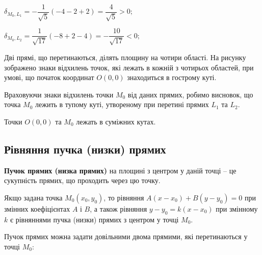 \begin{solution}
{}
	\parbox{\textwidth - 2.5cm}{
		$\delta_{M_0,L_1} = -\dfrac{1}{\sqrt{5}}(-4 -2 +2) = \dfrac{4}{\sqrt{5}} > 0;$
	
		$\delta_{M_0,L_2} = \dfrac{1}{\sqrt{17}}(-8 +2 -4) = -\dfrac{10}{\sqrt{17}} < 0;$
	
		Дві прямі, що перетинаються, ділять площину на
		чотири області. На рисунку зображено знаки відхилень
		точок, які лежать в кожній з чотирьох областей, при умові, що початок координат
		$O(0,0)$ знаходиться в гострому куті.
	}
	
	Враховуючи знаки відхилень точки $M_0$ від даних прямих, робимо висновок,
	що точка $M_0$ лежить в тупому куті, утвореному при перетині прямих $L_1$ та $L_2$.
	
	Точки $O(0,0)$ та $M_0$ лежать в суміжних кутах. 
\end{solution}

\subsection{Рівняння пучка (низки) прямих}

\begin{definition}
	\textbf{Пучок прямих (низка прямих)} на площині з центром у даній точці -- це  
	сукупність прямих, що проходить через цю точку.
\end{definition}

Якщо задана точка $M_0(x_0,y_0)$, то рівняння $A(x - x_0) + B(y - y_0) = 0$ при
змінних коефіцієнтах $A$ і $B$, а також рівняння $y-y_0 = k(x-x_0)$ при змінному $k$
є рівняннями пучка (низки) прямих з центром у точці $M_0$.

Пучок прямих можна задати довільними двома прямими, які перетинаються у
точці $M_0$:

